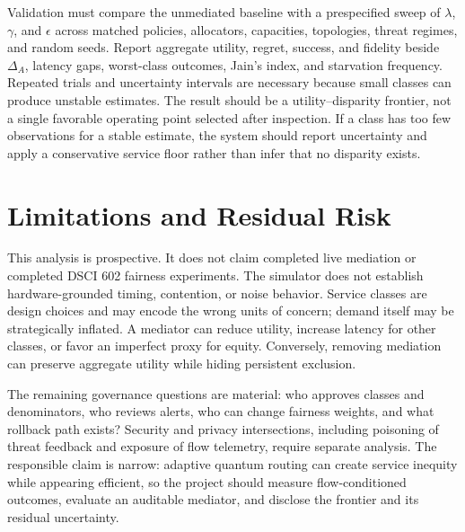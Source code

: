 \documentclass[10pt,conference]{IEEEtran}
\begin{document}
Validation must compare the unmediated baseline with a prespecified sweep of
$\lambda$, $\gamma$, and $\epsilon$ across matched policies, allocators,
capacities, topologies, threat regimes, and random seeds. Report aggregate
utility, regret, success, and fidelity beside $\Delta_A$, latency gaps,
worst-class outcomes, Jain's index, and starvation frequency. Repeated trials
and uncertainty intervals are necessary because small classes can produce
unstable estimates. The result should be a utility--disparity frontier, not a
single favorable operating point selected after inspection. If a class has too
few observations for a stable estimate, the system should report uncertainty
and apply a conservative service floor rather than infer that no disparity
exists.

\section{Limitations and Residual Risk}
This analysis is prospective. It does not claim completed live mediation or
completed DSCI 602 fairness experiments. The simulator does not establish
hardware-grounded timing, contention, or noise behavior. Service classes are
design choices and may encode the wrong units of concern; demand itself may be
strategically inflated. A mediator can reduce utility, increase latency for
other classes, or favor an imperfect proxy for equity. Conversely, removing
mediation can preserve aggregate utility while hiding persistent exclusion.

The remaining governance questions are material: who approves classes and
denominators, who reviews alerts, who can change fairness weights, and what
rollback path exists? Security and privacy intersections, including poisoning
of threat feedback and exposure of flow telemetry, require separate analysis.
The responsible claim is narrow: adaptive quantum routing can create
service inequity while appearing efficient, so the project should measure
flow-conditioned outcomes, evaluate an auditable mediator, and disclose the
frontier and its residual uncertainty.



\end{document}
